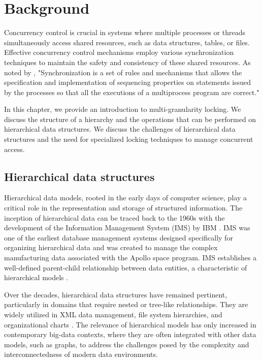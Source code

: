 %

\chapter{Background} \label{chap:background}

Concurrency control is crucial in systems where multiple processes or threads simultaneously access shared resources, such as data structures, tables, or files. 
Effective concurrency control mechanisms employ various synchronization techniques to maintain the safety and consistency of these shared resources. As noted by \citet{DBLP:books/daglib/0030596}, "Synchronization is a set of rules and mechanisms that allows the specification and implementation of sequencing properties on statements issued by the processes so that all the executions of a multiprocess program are correct."

In this chapter, we provide an introduction to multi-granularity locking. We discuss the structure of a hierarchy and the operations that can be performed on hierarchical data structures. We discuss the challenges of hierarchical data structures and the need for specialized locking techniques to manage concurrent access. 



\section{Hierarchical data structures}

Hierarchical data models, rooted in the early days of computer science, play a critical role in the representation and storage of structured information. The inception of hierarchical data can be traced back to the 1960s with the development of the Information Management System (IMS) by IBM \cite{IBMIMS}. IMS was one of the earliest database management systems designed specifically for organizing hierarchical data and was created to manage the complex manufacturing data associated with the Apollo space program. IMS establishes a well-defined parent-child relationship between data entities, a characteristic of hierarchical models \cite{DBLP:books/daglib/0006734}.

Over the decades, hierarchical data structures have remained pertinent, particularly in domains that require nested or tree-like relationships. They are widely utilized in XML data management, file system hierarchies, and organizational charts \cite{DBLP:books/mk/BunemanSA99}. The relevance of hierarchical models has only increased in contemporary big-data contexts, where they are often integrated with other data models, such as graphs, to address the challenges posed by the complexity and interconnectedness of modern data environments.

